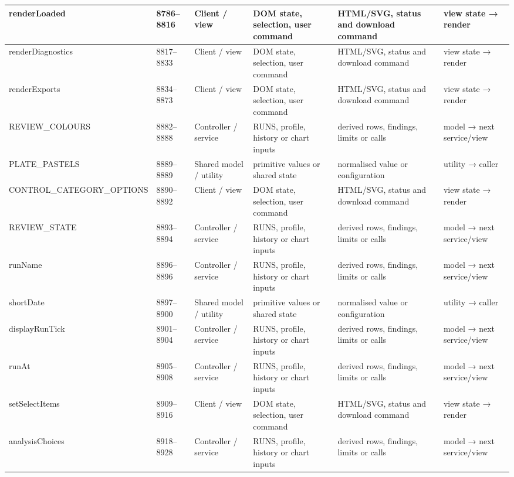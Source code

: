 \begin{landscape}
\begin{longtable}{@{}p{3.2cm}p{1.45cm}p{2.7cm}p{4.0cm}p{4.0cm}p{3.0cm}@{}}
renderLoaded & 8786--8816 & Client / view & DOM state, selection, user command & HTML/SVG, status and download command & view state → render \\\hline
renderDiagnostics & 8817--8833 & Client / view & DOM state, selection, user command & HTML/SVG, status and download command & view state → render \\\hline
renderExports & 8834--8873 & Client / view & DOM state, selection, user command & HTML/SVG, status and download command & view state → render \\\hline
REVIEW\_COLOURS & 8882--8888 & Controller / service & RUNS, profile, history or chart inputs & derived rows, findings, limits or calls & model → next service/view \\\hline
PLATE\_PASTELS & 8889--8889 & Shared model / utility & primitive values or shared state & normalised value or configuration & utility → caller \\\hline
CONTROL\_CATEGORY\_OPTIONS & 8890--8892 & Client / view & DOM state, selection, user command & HTML/SVG, status and download command & view state → render \\\hline
REVIEW\_STATE & 8893--8894 & Controller / service & RUNS, profile, history or chart inputs & derived rows, findings, limits or calls & model → next service/view \\\hline
runName & 8896--8896 & Controller / service & RUNS, profile, history or chart inputs & derived rows, findings, limits or calls & model → next service/view \\\hline
shortDate & 8897--8900 & Shared model / utility & primitive values or shared state & normalised value or configuration & utility → caller \\\hline
displayRunTick & 8901--8904 & Controller / service & RUNS, profile, history or chart inputs & derived rows, findings, limits or calls & model → next service/view \\\hline
runAt & 8905--8908 & Controller / service & RUNS, profile, history or chart inputs & derived rows, findings, limits or calls & model → next service/view \\\hline
setSelectItems & 8909--8916 & Client / view & DOM state, selection, user command & HTML/SVG, status and download command & view state → render \\\hline
analysisChoices & 8918--8928 & Controller / service & RUNS, profile, history or chart inputs & derived rows, findings, limits or calls & model → next service/view \\\hline

\end{longtable}
\end{landscape}

